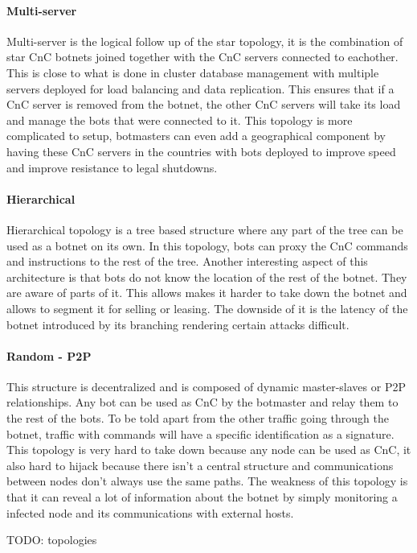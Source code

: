 \paragraph{Multi-server}
Multi-server is the logical follow up of the star topology, it is the combination of star CnC botnets joined together with the CnC servers connected to eachother. This is close to what is done in cluster database management with multiple servers deployed for load balancing and data replication. This ensures that if a CnC server is removed from the botnet, the other CnC servers will take its load and manage the bots that were connected to it. This topology is more complicated to setup, botmasters can even add a geographical component by having these CnC servers in the countries with bots deployed to improve speed and improve resistance to legal shutdowns.

\paragraph{Hierarchical}
Hierarchical topology is a tree based structure where any part of the tree can be used as a botnet on its own. In this topology, bots can proxy the CnC commands and instructions to the rest of the tree. Another interesting aspect of this architecture is that bots do not know the location of the rest of the botnet. They are aware of parts of it. This allows makes it harder to take down the botnet and allows to segment it for selling or leasing. The downside of it is the latency of the botnet introduced by its branching rendering certain attacks difficult.

\paragraph{Random - P2P}
This structure is decentralized and is composed of dynamic master-slaves or P2P relationships. Any bot can be used as CnC by the botmaster and relay them to the rest of the bots. To be told apart from the other traffic going through the botnet, traffic with commands will have a specific identification as a signature. This topology is very hard to take down because any node can be used as CnC, it also hard to hijack because there isn't a central structure and communications between nodes don't always use the same paths. The weakness of this topology is that it can reveal a lot of information about the botnet by simply monitoring a infected node and its communications with external hosts.

TODO: topologies
